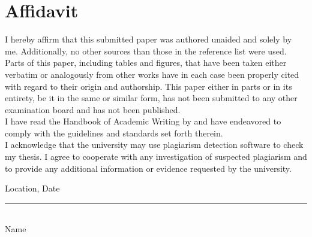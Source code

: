 \documentclass[12pt,final,a4paper,oneside]{book}
\begin{document}
\clearpage
\section*{Affidavit}

I hereby affirm that this submitted paper was authored unaided and solely by
me. Additionally, no other sources than those in the reference list were used.
Parts of this paper, including tables and figures, that have been taken either verbatim or analogously from other works have in each case been properly cited
with regard to their origin and authorship.
This paper either in parts or in its entirety, be it in the same or similar form, has
not been submitted to any other examination board and has not been published.\\

\noindent
I have read the Handbook of Academic Writing by  \cite{Hildebrandt2019} and have endeavored to comply with the guidelines and standards set forth therein.\\

\noindent
I acknowledge that the university may use plagiarism detection software to check my thesis. I agree to cooperate with any investigation of suspected plagiarism and to provide any additional information or evidence requested by the university.\\\bigskip

\noindent
Location, Date\\\vspace{5em}

\noindent
\rule{20em}{1pt}\\
Name

	
\end{document}
